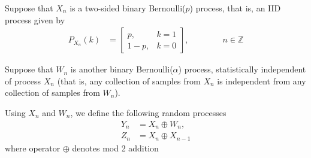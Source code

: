\ifspanish

\else

Suppose that $X_n$ is a two-sided binary Bernoulli($p$) process, that is, an IID process given by
\begin{align*}
P_{X_n}(k) 
	&= \left[\begin{array}{ll}
             p,   &  k=1   \\
             1-p, &  k=0
          \end{array} \right]   %
,   \qquad\qquad n\in \mathbb{Z}
\end{align*}

Suppose that $W_n$ is another binary Bernoulli($\alpha$) process, statistically independent of process $X_n$ (that is, any collection of samples from $X_n$ is independent from any collection of samples from $W_n$). 

Using $X_n$ and $W_n$, we define the following random processes
\begin{align*}
Y_n &= X_n \oplus W_n,      \\
Z_n &= X_n \oplus X_{n-1}
\end{align*}
where operator $\oplus$ denotes mod 2 addition


